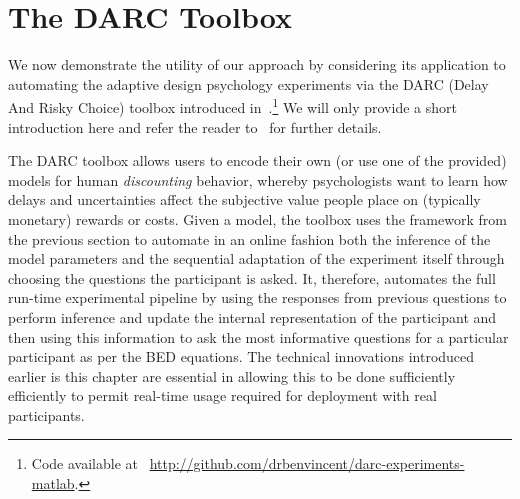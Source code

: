 
\section{The DARC Toolbox}
\label{sec:design:darc}

We now demonstrate the utility of our approach by considering its application 
to automating the adaptive design psychology experiments via the DARC (Delay
And Risky Choice) toolbox introduced in~\cite{vincent2017darc}.\footnote{Code available at~ \url{http://github.com/drbenvincent/darc-experiments-matlab}.}  We will only provide
a short introduction here and refer the reader to~\cite{vincent2017darc} for further details.

The DARC toolbox allows users 
to encode their own (or use one of the provided) models for human \emph{discounting} behavior,
whereby psychologists want to learn how delays and uncertainties affect the subjective value people place
on (typically monetary) rewards or costs. Given a model, the toolbox uses the framework from the
previous section to automate in an online fashion 
both the inference of the model parameters and the sequential adaptation of the experiment itself through
choosing the questions the participant is asked.  It, therefore, automates the full run-time experimental 
pipeline  by using the responses from previous questions to perform inference 
and update the internal representation
of the participant and then using this information to ask the most informative questions for a particular
participant as per the BED equations.  The technical innovations introduced earlier is this chapter
are essential in allowing this to be done sufficiently efficiently to permit
real-time usage required for deployment with real participants.

